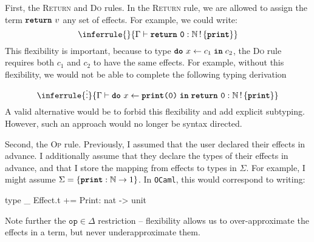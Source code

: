 First, the \textsc{Return} and \textsc{Do} rules. In the \textsc{Return} rule, we are allowed to assign the term $\texttt{\textbf{return}} \,\, {v}$ any set of effects. For example, we could write:
\[\inferrule{ }{\type[]{\return{\texttt{0}}}{\effectType[\{ \textbf{\texttt{print}} \}]{\mathbb{N}}}}\] 
This flexibility is important, because to type $\texttt{\textbf{do}} \,\, {x} \leftarrow {c_1} \; \textbf{\texttt{in}} \; {c_2}$, the \textsc{Do} rule requires both $c_1$ and $c_2$ to have the same effects. For example, without this flexibility, we would not be able to complete the following typing derivation
\[\inferrule{\vdots}{\type[]{\bind{x}{\print{0}}{\return{\texttt{0}}}}{\effectType[\{ \textbf{\texttt{print}} \}]{\mathbb{N}}}}\] 
A valid alternative would be to forbid this flexibility and add explicit subtyping. However, such an approach would no longer be syntax directed. 

Second, the \textsc{Op} rule. Previously, I assumed that the user declared their effects in advance. I additionally assume that they declare the types of their effects in advance, and that I store the mapping from effects to types in $\Sigma$. For example, I might assume $\Sigma = \{ \textbf{\texttt{print}}: \mathbb{N} \to 1 \}$. In \texttt{OCaml}, this would correspond to writing:
\begin{ocaml}
type _ Effect.t += Print: nat -> unit
\end{ocaml}
Note further the $\texttt{op} \in \Delta$ restriction -- flexibility allows us to over-approximate the effects in a term, but never underapproximate them. 

